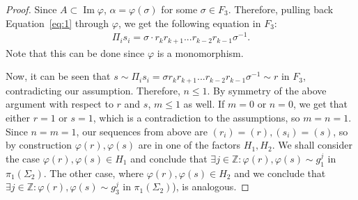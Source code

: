 \documentclass[11pt]{article}
\newenvironment{myequation}
    {
        \begin{equation*}
        \begin{gathered}
    }
    { 
        \end{gathered} 
        \end{equation*}
    }
\newcommand{\Z}{\mathbb{Z}}
\DeclareMathOperator{\Ima}{Im}
\begin{document}
\begin{proof}
        Since $A \subset \Ima \varphi$, $\alpha = \varphi(\sigma)$ for some $\sigma \in F_3$. Therefore, pulling back Equation~\ref{eq:1} through $\varphi$, we get the following equation in $F_3$:
        \begin{myequation}
            \Pi_i s_i = \sigma \cdot r_k r_{k+1} ... r_{k-2} r_{k-1} \sigma^{-1} .
        \end{myequation}
        Note that this can be done since $\varphi$ is a monomorphism.
        
        Now, it can be seen that $s \sim \Pi_i s_i = \sigma r_k r_{k+1} ... r_{k-2} r_{k-1} \sigma^{-1} \sim r$ in $F_3$, contradicting our assumption. Therefore, $n \leq 1$. By symmetry of the above argument with respect to $r$ and $s$, $m \leq 1$ as well. If $m = 0$ or $n = 0$, we get that either $r=1$ or $s=1$, which is a contradiction to the assumptions, so $m = n = 1$. \\

        Since $n = m = 1$, our sequences from above are $(r_i) = (r), (s_i) = (s)$, so by construction $\varphi(r), \varphi(s)$ are in one of the factors $H_1,H_2$. We shall consider the case $\varphi(r),\varphi(s) \in H_1$ and conclude that $\exists j \in \Z : \varphi(r),\varphi(s) \sim g_1^j$ in $\pi_1(\Sigma_2)$. The other case, where $\varphi(r),\varphi(s) \in H_2$ and we conclude that $\exists j \in \Z : \varphi(r),\varphi(s) \sim g_3^j$ in $\pi_1(\Sigma_2)$), is analogous.
        

\end{proof}
\end{document}
